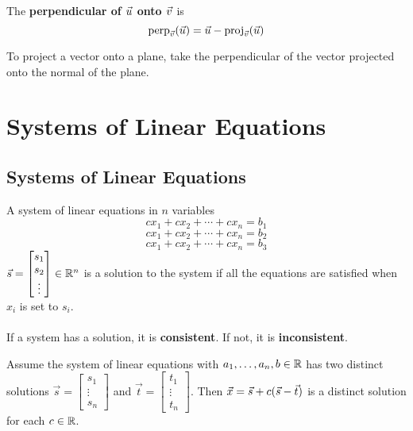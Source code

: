 \documentclass[english, 12pt]{article}
\begin{document}
\begin{defn}
The \textbf{perpendicular of $\vec{u}$ onto $\vec{v}$} is
\[\operatorname{perp}_{\vec{v}}(\vec{u}) = \vec{u} - \operatorname{proj}_{\vec{v}}(\vec{u})\]
\end{defn}

\begin{qte}
To project a vector onto a plane, take the perpendicular of the vector projected onto the normal of the plane.
\end{qte}

\section{Systems of Linear Equations}

\subsection{Systems of Linear Equations}

\begin{defn}
A {system of linear equations in $n$ variables}
\begin{equation}
c x_{1} + c x_{2} + \cdots + c x_{n} = b_{1}
\end{equation}
\begin{equation}
c x_{1} + c x_{2} + \cdots + c x_{n} = b_{2}
\end{equation}
\begin{equation}
c x_{1} + c x_{2} +\cdots + c x_{n} = b_{3}
\end{equation}
$\vec{s} = \begin{bmatrix} s_{1} \\ s_{2} \\ \vdots \end{bmatrix} \in {\mathbb{R}}^n$ is a solution to the system if all the equations are satisfied when $x_{i}$ is set to $s_{i}$.\\\\
If a system has a solution, it is \textbf{consistent}. If not, it is \textbf{inconsistent}.
\end{defn}

\begin{thrm}
Assume the system of linear equations with $a_{1},\dots,a_{n}, b \in {\mathbb{R}}$ has two distinct solutions $\vec{s} = \begin{bmatrix} s_{1} \\ \vdots \\ s_{n} \end{bmatrix}$ and $\vec{t} = \begin{bmatrix} t_{1} \\ \vdots \\ t_{n} \end{bmatrix}$. Then $\vec{x} = \vec{s} + c(\vec{s} - \vec{t})$ is a distinct solution for each $c \in {\mathbb{R}}$.
\end{thrm}
\end{document}
